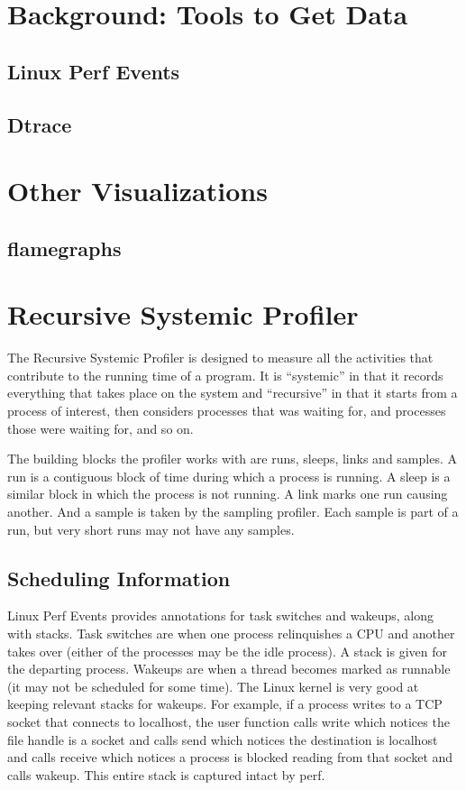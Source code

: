 \documentclass[10pt]{article}
\begin{document}
\section{Background: Tools to Get Data}

\subsection{Linux Perf Events}

\subsection{Dtrace}

\section{Other Visualizations}

\subsection{flamegraphs}

\section{Recursive Systemic Profiler}

The Recursive Systemic Profiler is designed to measure all the activities that contribute to the running time of a program.  It is ``systemic'' in that it records everything that takes place on the system and ``recursive'' in that it starts from a process of interest, then considers processes that was waiting for, and processes those were waiting for, and so on.

The building blocks the profiler works with are runs, sleeps, links and samples.  A run is a contiguous block of time during which a process is running.  A sleep is a similar block in which the process is not running.  A link marks one run causing another.  And a sample is taken by the sampling profiler.  Each sample is part of a run, but very short runs may not have any samples.

\subsection{Scheduling Information}

Linux Perf Events provides annotations for task switches and wakeups, along with stacks.  Task switches are when one process relinquishes a CPU and another takes over (either of the processes may be the idle process).  A stack is given for the departing process.  Wakeups are when a thread becomes marked as runnable (it may not be scheduled for some time).  The Linux kernel is very good at keeping relevant stacks for wakeups.  For example, if a process writes to a TCP socket that connects to localhost, the user function calls write which notices the file handle is a socket and calls send which notices the destination is localhost and calls receive which notices a process is blocked reading from that socket and calls wakeup.  This entire stack is captured intact by perf.
\end{document}
